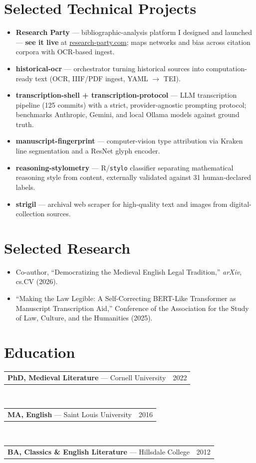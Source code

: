 \documentclass[11pt,letterpaper]{article}
\makeatletter
\newcommand{\edu}[3]{%
  \noindent\begin{tabularx}{\linewidth}{@{}X r@{}}%
    \textbf{#1} \textnormal{— #2} & #3\\
  \end{tabularx}}
\newcommand{\proj}[2]{\item \textbf{#1} --- #2}
\makeatother
\begin{document}
\section{Selected Technical Projects}
\begin{itemize}
  \proj{Research Party}{bibliographic-analysis platform I designed and launched --- \textbf{see it live} at \href{https://research-party.com}{research-party.com}; maps networks and bias across citation corpora with OCR-based ingest.}
  \proj{historical-ocr}{orchestrator turning historical sources into computation-ready text (OCR, IIIF/PDF ingest, YAML $\rightarrow$ TEI).}
  \proj{transcription-shell + transcription-protocol}{LLM transcription pipeline (125 commits) with a strict, provider-agnostic prompting protocol; benchmarks Anthropic, Gemini, and local Ollama models against ground truth.}
  \proj{manuscript-fingerprint}{computer-vision type attribution via Kraken line segmentation and a ResNet glyph encoder.}
  \proj{reasoning-stylometry}{R/\texttt{stylo} classifier separating mathematical reasoning style from content, externally validated against 31 human-declared labels.}
  \proj{strigil}{archival web scraper for high-quality text and images from digital-collection sources.}
\end{itemize}

\section{Selected Research}
\begin{itemize}
  \item Co-author, ``Democratizing the Medieval English Legal Tradition,'' \textit{arXiv}, cs.CV (2026).
  \item ``Making the Law Legible: A Self-Correcting BERT-Like Transformer as Manuscript Transcription Aid,'' Conference of the Association for the Study of Law, Culture, and the Humanities (2025).
\end{itemize}

\section{Education}
\edu{PhD, Medieval Literature}{Cornell University}{2022}\\[3pt]
\edu{MA, English}{Saint Louis University}{2016}\\[3pt]
\edu{BA, Classics \& English Literature}{Hillsdale College}{2012}
\end{document}
